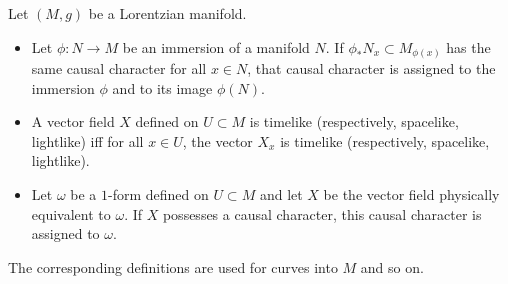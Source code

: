 Let $(M, g)$ be a Lorentzian manifold.
\begin{itemize}
  \item Let $\phi: N \to M$ be an immersion of a manifold $N$. If $\phi_* N_x \subset M_{\phi(x)}$ has the same causal character for all $x \in N$, that causal character is assigned to the immersion $\phi$ and to its image $\phi(N)$.
  \item A vector field $X$ defined on $U \subset M$ is timelike (respectively, spacelike, lightlike) iff for all $x \in U$, the vector $X_x$ is timelike (respectively, spacelike, lightlike).
  \item Let $\omega$ be a $1$-form defined on $U \subset M$ and let $X$ be the vector field physically equivalent to $\omega$. If $X$ possesses a causal character, this causal character is assigned to $\omega$.
\end{itemize}
The corresponding definitions are used for curves into $M$ and so on.
